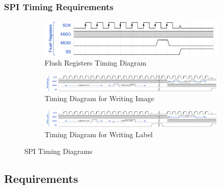 \documentclass[12pt]{article}
\begin{document}
\subsubsection{SPI Timing Requirements}
\begin{figure}
  \centering
  \begin{subfigure}[h]{0.5\textwidth}
    \includegraphics[width=\textwidth]{FlushRegistersWave.pdf}
    \caption{Flush Registers Timing Diagram}
    \vspace{2cm}
  \end{subfigure}

  \begin{subfigure}[h]{\textwidth}
    \includegraphics[width=\textwidth]{WriteImageWave.pdf}
    \caption{Timing Diagram for Writing Image}
    \vspace{2cm}
  \end{subfigure}

  \begin{subfigure}[h]{\textwidth}
    \includegraphics[width=\textwidth]{WriteLabelWave.pdf}
    \caption{Timing Diagram for Writing Label}
    \vspace{1cm}
  \end{subfigure}
  \caption{SPI Timing Diagrams}
\end{figure}
\FloatBarrier

\newpage
\subsection{Requirements}
\end{document}
